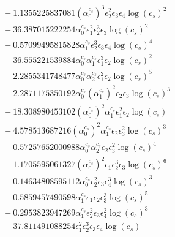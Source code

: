 \documentclass[10pt]{article}
\begin{document}
\begin{align*}
&{}  - 1.1355225837081 \left(\alpha_{0}^{c_s}\right)^{3} \epsilon_{2}^{2} \epsilon_{3} \epsilon_{4} \log{\left(c_{s} \right)}^{2} \\
&{}  - 36.387015222254 \alpha_{0}^{c_s} \epsilon_{1}^{2} \epsilon_{2}^{3} \epsilon_{3} \log{\left(c_{s} \right)}^{2} \\
&{}  - 0.57099495815828 \alpha_{1}^{c_s} \epsilon_{2}^{3} \epsilon_{3} \epsilon_{4} \log{\left(c_{s} \right)}^{4} \\
&{}  - 36.555221539884 \alpha_{0}^{c_s} \alpha_{1}^{c_s} \epsilon_{1}^{3} \epsilon_{2} \log{\left(c_{s} \right)}^{2} \\
&{}  - 2.2855341748477 \alpha_{0}^{c_s} \alpha_{2}^{c_s} \epsilon_{1}^{2} \epsilon_{2} \log{\left(c_{s} \right)}^{5} \\
&{}  - 2.2871175350192 \alpha_{0}^{c_s} \left(\alpha_{1}^{c_s}\right)^{2} \epsilon_{2} \epsilon_{3} \log{\left(c_{s} \right)}^{3} \\
&{}  - 18.308980453102 \left(\alpha_{0}^{c_s}\right)^{2} \alpha_{1}^{c_s} \epsilon_{1}^{2} \epsilon_{2} \log{\left(c_{s} \right)} \\
&{}  - 4.578513687216 \left(\alpha_{0}^{c_s}\right)^{2} \alpha_{1}^{c_s} \epsilon_{2} \epsilon_{3}^{2} \log{\left(c_{s} \right)}^{3} \\
&{}  - 0.57257652000988 \alpha_{0}^{c_s} \alpha_{2}^{c_s} \epsilon_{2} \epsilon_{3}^{2} \log{\left(c_{s} \right)}^{4} \\
&{}  - 1.1705595061327 \left(\alpha_{0}^{c_s}\right)^{2} \epsilon_{1} \epsilon_{2}^{3} \epsilon_{3} \log{\left(c_{s} \right)}^{6} \\
&{}  - 0.14634808595112 \alpha_{0}^{c_s} \epsilon_{2}^{2} \epsilon_{3} \epsilon_{4}^{3} \log{\left(c_{s} \right)}^{3} \\
&{}  - 0.5859457490598 \alpha_{1}^{c_s} \epsilon_{1} \epsilon_{2} \epsilon_{3}^{3} \log{\left(c_{s} \right)}^{5} \\
&{}  - 0.2953823947269 \alpha_{1}^{c_s} \epsilon_{2}^{2} \epsilon_{3} \epsilon_{4}^{2} \log{\left(c_{s} \right)}^{3} \\
&{}  - 37.811491088254 \epsilon_{1}^{2} \epsilon_{2}^{3} \epsilon_{3} \epsilon_{4} \log{\left(c_{s} \right)}
\end{align*}
\end{document}
